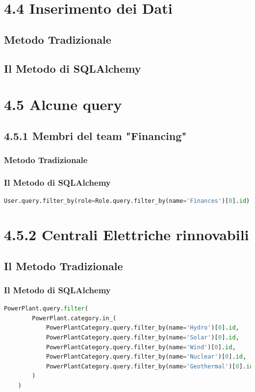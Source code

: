 \section*{4.4 \hspace{1cm} Inserimento dei Dati}
\subsection*{Metodo Tradizionale}


\subsection*{Il Metodo di SQLAlchemy}



\section*{4.5 \hspace{1cm} Alcune query}
\subsection*{4.5.1 \hspace{1cm} Membri del team "Financing"}
\subsubsection*{Metodo Tradizionale}


\subsubsection*{Il Metodo di SQLAlchemy}
\begin{lstlisting}[language=Python]
User.query.filter_by(role=Role.query.filter_by(name='Finances')[0].id)
\end{lstlisting}


\section*{4.5.2 \hspace{1cm} Centrali Elettriche rinnovabili}
\subsection*{Il Metodo Tradizionale}


\subsubsection*{Il Metodo di SQLAlchemy}
\begin{lstlisting}[language=Python]
    PowerPlant.query.filter(
        PowerPlant.category.in_(
            PowerPlantCategory.query.filter_by(name='Hydro')[0].id,
            PowerPlantCategory.query.filter_by(name='Solar')[0].id,
            PowerPlantCategory.query.filter_by(name='Wind')[0].id,
            PowerPlantCategory.query.filter_by(name='Nuclear')[0].id,
            PowerPlantCategory.query.filter_by(name='Geothermal')[0].id,
        )
    )
\end{lstlisting}
